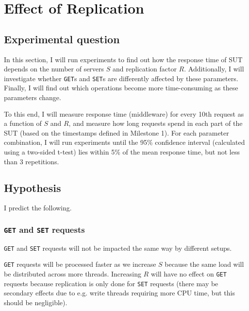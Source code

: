 \documentclass[11pt]{article}
\newcommand{\get}[0]{\texttt{GET}}
\newcommand{\set}[0]{\texttt{SET}}
\begin{document}
\clearpage
\section{Effect of Replication}
\label{sec:exp2}

\subsection{Experimental question}

In this section, I will run experiments to find out how the response time of SUT depends on the number of servers $S$ and replication factor $R$. Additionally, I will investigate whether \get{}s and \set{}s are differently affected by these parameters. Finally, I will find out which operations become more time-consuming as these parameters change.

To this end, I will measure response time (middleware) for every 10th request as a function of $S$ and $R$, and measure how long requests spend in each part of the SUT (based on the timestamps defined in Milestone 1). For each parameter combination, I will run experiments until the 95\% confidence interval (calculated using a two-sided t-test) lies within 5\% of the mean response time, but not less than 3 repetitions.

\subsection{Hypothesis}

I predict the following.

\subsubsection{\get{} and \set{} requests}
\get{} and \set{} requests will not be impacted the same way by different setups.

\get{} requests will be processed faster as we increase $S$ because the same load will be distributed across more threads. Increasing $R$ will have no effect on \get{} requests because replication is only done for \set{} requests (there may be secondary effects due to e.g. write threads requiring more CPU time, but this should be negligible).
\end{document}
